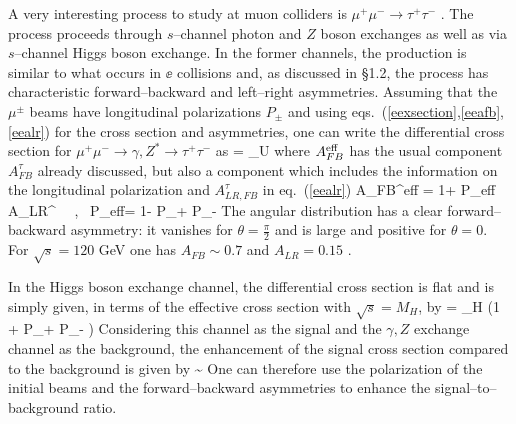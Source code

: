A very interesting process to study at muon colliders is $\mu^+ \mu^- \to
\tau^+ \tau^-$ \cite{mu-Htau,mu-Htau0}. The process proceeds
through $s$--channel photon and $Z$ boson exchanges as well as via $s$--channel
Higgs boson exchange. In the former channels, the production is similar to what
occurs in $\ee$ collisions and,  as discussed in \S1.2, the process has
characteristic forward--backward and left--right asymmetries. Assuming that the
$\mu^\pm$ beams have longitudinal  polarizations $P_\pm$ and  using
eqs.~(\ref{eexsection},\ref{eeafb},\ref{eealr}) for the cross
section and asymmetries,  one can write the differential cross section for
$\mu^+ \mu^- \to \gamma, Z^* \to \tau^+ \tau^-$ as
\beq
{}=
 \times {} \sigma_U 
\eeq
where $A_{FB}^{\rm eff}$ has the usual component $A_{FB}^\tau$ already 
discussed, but also a component which includes the information on the
longitudinal polarization and $A_{LR,FB}^\tau$ in eq.~(\ref{eealr})
\beq
A_{FB}^{\rm eff} = 
{1+ P_{\rm eff} A_{LR}^\tau } \ \ , \  P_{\rm eff}= 
{1- P_+ P_-}
\eeq
The angular distribution has a clear forward--backward asymmetry: it vanishes
for $\theta=\frac{\pi}{2}$ and is large and positive for $\theta=0$. For 
$\sqrt{s}=120$ GeV one has  $A_{FB} \sim 0.7$ and $A_{LR}=0.15$
\cite{mu-Htau}. \s

In the Higgs boson exchange channel, the differential cross section is
flat and is simply given, in terms of the effective cross section with
$\sqrt{s}=M_H$,  by
\beq
{} =  \overline{\sigma}_H
\left (1 + P_+ P_- \right)
\eeq
Considering this channel as the signal and the $\gamma,Z$ exchange channel
as the background, the enhancement of the signal cross section compared to
the background is given by
\beq
{} \sim {}
\eeq
One can therefore use the polarization of the initial beams and the
forward--backward asymmetries to enhance the signal--to--background ratio. \s

